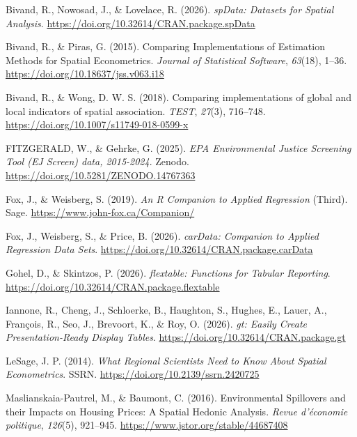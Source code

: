 \documentclass[
  norsk,
  a4paper,
]{article}
\newcounter{none} %
\newlength{\cslhangindent}
\newenvironment{CSLReferences}[2] %
 {\begin{list}{}{%
  \setlength{\itemindent}{0pt}
  \setlength{\leftmargin}{0pt}
  \setlength{\parsep}{0pt}
  \ifodd #1
   \setlength{\leftmargin}{\cslhangindent}
   \setlength{\itemindent}{-1\cslhangindent}
  \fi
  \setlength{\itemsep}{#2\baselineskip}}}
 {\end{list}}
\begin{document}
\begin{CSLReferences}{1}{0}
Bivand, R., Nowosad, J., \& Lovelace, R. (2026). \emph{{spData}:
Datasets for Spatial Analysis}.
\url{https://doi.org/10.32614/CRAN.package.spData}

Bivand, R., \& Piras, G. (2015). Comparing Implementations of Estimation
Methods for Spatial Econometrics. \emph{Journal of Statistical
Software}, \emph{63}(18), 1--36.
\url{https://doi.org/10.18637/jss.v063.i18}

Bivand, R., \& Wong, D. W. S. (2018). Comparing implementations of
global and local indicators of spatial association. \emph{TEST},
\emph{27}(3), 716--748. \url{https://doi.org/10.1007/s11749-018-0599-x}

FITZGERALD, W., \& Gehrke, G. (2025). \emph{{EPA} {Environmental}
{Justice} {Screening} {Tool} ({EJ} {Screen}) data, 2015-2024}. Zenodo.
\url{https://doi.org/10.5281/ZENODO.14767363}

Fox, J., \& Weisberg, S. (2019). \emph{An {R} Companion to Applied
Regression} (Third). Sage. \url{https://www.john-fox.ca/Companion/}

Fox, J., Weisberg, S., \& Price, B. (2026). \emph{{carData}: Companion
to Applied Regression Data Sets}.
\url{https://doi.org/10.32614/CRAN.package.carData}

Gohel, D., \& Skintzos, P. (2026). \emph{{flextable}: Functions for
Tabular Reporting}.
\url{https://doi.org/10.32614/CRAN.package.flextable}

Iannone, R., Cheng, J., Schloerke, B., Haughton, S., Hughes, E., Lauer,
A., François, R., Seo, J., Brevoort, K., \& Roy, O. (2026). \emph{{gt}:
Easily Create Presentation-Ready Display Tables}.
\url{https://doi.org/10.32614/CRAN.package.gt}

LeSage, J. P. (2014). \emph{What {Regional} {Scientists} {Need} to
{Know} {About} {Spatial} {Econometrics}}. SSRN.
\url{https://doi.org/10.2139/ssrn.2420725}

Maslianskaia-Pautrel, M., \& Baumont, C. (2016). Environmental
{Spillovers} and their {Impacts} on {Housing} {Prices}: {A} {Spatial}
{Hedonic} {Analysis}. \emph{Revue d'économie politique}, \emph{126}(5),
921--945. \url{https://www.jstor.org/stable/44687408}


\end{CSLReferences}
\end{document}
